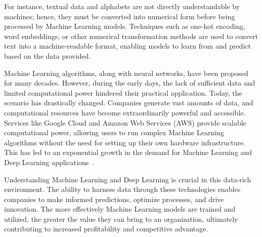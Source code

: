\documentclass[12pt,a4paper]{report}
\begin{document}
For instance, textual data and alphabets are not directly understandable by machines; hence, they must be converted into numerical form before being processed by Machine Learning models. Techniques such as one-hot encoding, word embeddings, or other numerical transformation methods are used to convert text into a machine-readable format, enabling models to learn from and predict based on the data provided.

Machine Learning algorithms, along with neural networks, have been proposed for many decades. However, during the early days, the lack of sufficient data and limited computational power hindered their practical application. Today, the scenario has drastically changed. Companies generate vast amounts of data, and computational resources have become extraordinarily powerful and accessible. Services like Google Cloud and Amazon Web Services (AWS) provide scalable computational power, allowing users to run complex Machine Learning algorithms without the need for setting up their own hardware infrastructure. This has led to an exponential growth in the demand for Machine Learning and Deep Learning applications~\cite{machinelearning}.

Understanding Machine Learning and Deep Learning is crucial in this data-rich environment. The ability to harness data through these technologies enables companies to make informed predictions, optimize processes, and drive innovation. The more effectively Machine Learning models are trained and utilized, the greater the value they can bring to an organization, ultimately contributing to increased profitability and competitive advantage.
\end{document}
